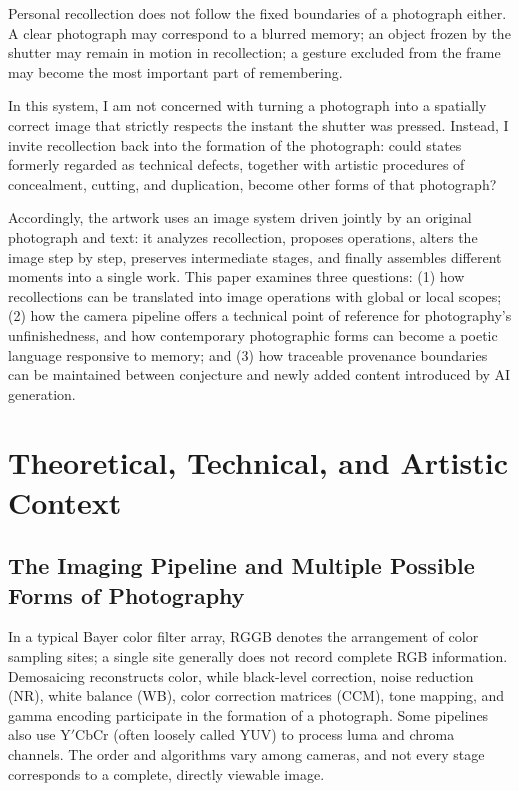 \documentclass[manuscript,review,anonymous,authoryear]{acmart}
\begin{document}
Personal recollection does not follow the fixed boundaries of a photograph either. A clear photograph may correspond to a blurred memory; an object frozen by the shutter may remain in motion in recollection; a gesture excluded from the frame may become the most important part of remembering.


In this system, I am not concerned with turning a photograph into a spatially correct image that strictly respects the instant the shutter was pressed. Instead, I invite recollection back into the formation of the photograph: could states formerly regarded as technical defects, together with artistic procedures of concealment, cutting, and duplication, become other forms of that photograph?


Accordingly, the artwork uses an image system driven jointly by an original photograph and text: it analyzes recollection, proposes operations, alters the image step by step, preserves intermediate stages, and finally assembles different moments into a single work. This paper examines three questions: (1) how recollections can be translated into image operations with global or local scopes; (2) how the camera pipeline offers a technical point of reference for photography's unfinishedness, and how contemporary photographic forms can become a poetic language responsive to memory; and (3) how traceable provenance boundaries can be maintained between conjecture and newly added content introduced by AI generation.


\section{Theoretical, Technical, and Artistic Context}

\subsection{The Imaging Pipeline and Multiple Possible Forms of Photography}

In a typical Bayer color filter array, RGGB denotes the arrangement of color sampling sites; a single site generally does not record complete RGB information. Demosaicing reconstructs color, while black-level correction, noise reduction (NR), white balance (WB), color correction matrices (CCM), tone mapping, and gamma encoding participate in the formation of a photograph. Some pipelines also use Y$\prime$CbCr (often loosely called YUV) to process luma and chroma channels. The order and algorithms vary among cameras, and not every stage corresponds to a complete, directly viewable image.
\end{document}
